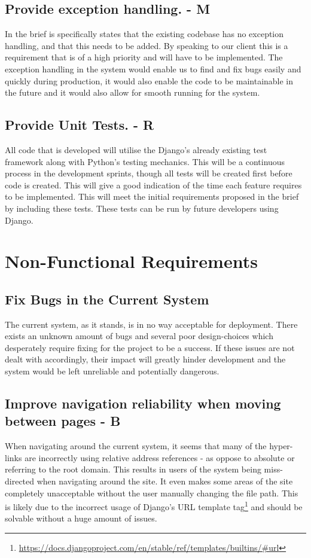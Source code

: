 \documentclass[12pt]{article}
\begin{document}
	\subsection{Provide exception handling. - M}
	In the brief is specifically states that the existing codebase has no exception handling, and that this needs to be added. By speaking to our client this is a requirement that is of a high priority and will have to be implemented.
The exception handling in the system would enable us to find and fix bugs easily and quickly during production, it would also enable the code to be maintainable in the future and it would also allow for smooth running for the system.

	\subsection{Provide Unit Tests. - R}
	All code that is developed will utilise the Django’s already existing test framework along with Python’s testing mechanics. This will be a continuous process in the development sprints, though all tests will be created first before code is created. This will give a good indication of the time each feature requires to be implemented. This will meet the initial requirements proposed in the brief by including these tests. These tests can be run by future developers using Django.

	\newpage
	
	\section{Non-Functional Requirements}
	\subsection{Fix Bugs in the Current System}
	The current system, as it stands, is in no way acceptable for deployment. There exists an unknown amount of bugs and several poor design-choices which desperately require fixing for the project to be a success. If these issues are not dealt with accordingly, their impact will greatly hinder development and the system would be left unreliable and potentially dangerous.
	\subsection{Improve navigation reliability when moving between pages - B}
	When navigating around the current system, it seems that many of the hyper-links are incorrectly using relative address references - as oppose to absolute or referring to the root domain. This results in users of the system being miss-directed when navigating around the site. It even makes some areas of the site completely unacceptable without the user manually changing the file path.  This is likely due to the incorrect usage of Django's URL template tag\footnote{\url{https://docs.djangoproject.com/en/stable/ref/templates/builtins/#url}} and should be solvable without a huge amount of issues.
\end{document}

